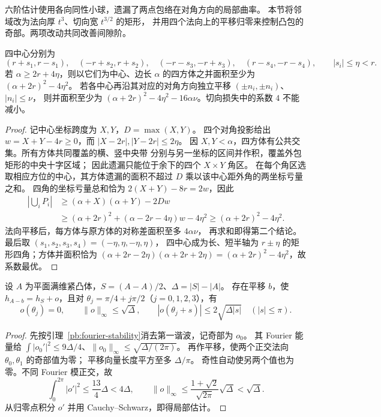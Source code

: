 六阶估计使用各向同性小球，遗漏了两点包络在对角方向的局部曲率。
本节将邻域改为法向厚 $t^3$、切向宽 $t^{3/2}$ 的矩形，
并用四个法向上的平移归零来控制凸包的奇部。两项改动共同改善间隙阶。

\begin{lemma}[四方体并的切向损失]\label{pb:tangent-union}
四中心分别为
\[
 (r+s_1,r-s_1),\quad(-r+s_2,r+s_2),\quad
 (-r-s_3,-r+s_3),\quad(r-s_4,-r-s_4),\qquad |s_i|\le\eta<r.
\]
若 $\alpha\ge2r+4\eta$，则以它们为中心、边长 $\alpha$ 的四方体之并面积至少为
$(\alpha+2r)^2-4\eta^2$。
若各中心再沿其对应的对角方向独立平移 $(\pm n_i,\pm n_i)$、$|n_i|\le\nu$，
则并面积至少为 $(\alpha+2r)^2-4\eta^2-16\alpha\nu$。切向损失中的系数 $4$ 不能减小。
\end{lemma}
\begin{proof}
记中心坐标跨度为 $X,Y$，$D=\max(X,Y)$。
四个对角投影给出 $w=X+Y-4r\ge0$，而 $|X-2r|,|Y-2r|\le2\eta$。
因 $X,Y<\alpha$，四方体有公共交集。所有方体共同覆盖的横、竖中央带
分别与另一坐标的区间并作积，覆盖外包矩形的中央十字区域；
因此遗漏只能位于余下的四个 $X\times Y$ 角区。
在每个角区选取相应方位的中心，其方体遗漏的面积不超过
$D$ 乘以该中心距外角的两坐标亏量之和。
四角的坐标亏量总和恰为 $2(X+Y)-8r=2w$，因此
\begin{align*}
 \left|\bigcup_iP_i\right|
 &\ge(\alpha+X)(\alpha+Y)-2Dw\\
 &\ge(\alpha+2r)^2+(\alpha-2r-4\eta)w-4\eta^2
 \ge(\alpha+2r)^2-4\eta^2.
\end{align*}
法向平移后，每方体与原方体的对称差面积至多 $4\alpha\nu$，
再求和即得第二个结论。最后取 $(s_1,s_2,s_3,s_4)=(-\eta,\eta,-\eta,\eta)$，
四中心成为长、短半轴为 $r\pm\eta$ 的矩形四角；方体并面积恰为
$(\alpha+2r-2\eta)(\alpha+2r+2\eta)=(\alpha+2r)^2-4\eta^2$，故系数最优。
\end{proof}

\begin{lemma}[四法向归零的奇部控制]\label{pb:four-normal}
设 $A$ 为平面满维紧凸体，$S=(A-A)/2$、$\Delta=|S|-|A|$。
存在平移 $b$，使 $h_{A-b}=h_S+o$，且对
$\theta_j=\pi/4+j\pi/2$（$j=0,1,2,3$），有
\[
 o(\theta_j)=0,\qquad\|o\|_\infty\le\sqrt\Delta,\qquad
 |o(\theta_j+s)|\le2\sqrt{\Delta|s|}\quad(|s|\le\pi).
\]
\end{lemma}
\begin{proof}
先按引理~\ref{pb:fourier-stability}消去第一谐波，记奇部为 $o_0$。
其 Fourier 能量给
$\int|o_0'|^2\le9\Delta/4$、$\|o_0\|_\infty\le\sqrt{\Delta/(2\pi)}$。
再作平移，使两个正交法向 $\theta_0,\theta_1$ 的奇部值为零；
平移向量长度平方至多 $\Delta/\pi$。
奇性自动使另两个值也为零。不同 Fourier 模正交，故
\[
 \int_0^{2\pi}|o'|^2\le\frac{13}4\Delta<4\Delta,\qquad
 \|o\|_\infty\le\frac{1+\sqrt2}{\sqrt{2\pi}}\sqrt\Delta<\sqrt\Delta.
\]
从归零点积分 $o'$ 并用 Cauchy--Schwarz，即得局部估计。
\end{proof}

